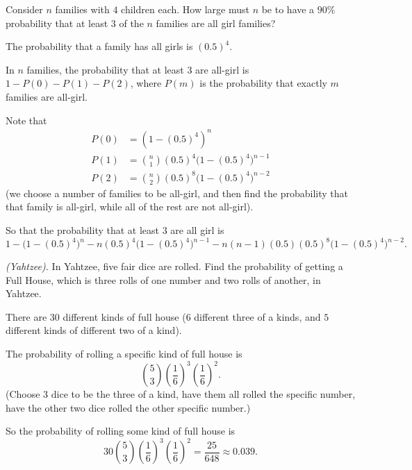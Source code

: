 \begin{problem}[Handout 5, \# 8]
  Consider \(n\) families with \(4\) children each. How large must \(n\) be
  to have a \(90\%\) probability that at least \(3\) of the \(n\) families
  are all girl families?
\end{problem}
\begin{solution}
  The probability that a family has all girls is $(0.5)^4$.

  In $n$ families, the probability that at least $3$ are all-girl is
  $1-P(0)-P(1)-P(2)$, where $P(m)$ is the probability that exactly $m$
  families are all-girl.

  Note that
  \begin{align*}
    P(0) &= (1-(0.5)^4)^n \\
    P(1) &= \binom{n}{1}(0.5)^4\bigl(1-(0.5)^4\bigr)^{n-1} \\
    P(2) &= \binom{n}{2}(0.5)^8\bigl(1-(0.5)^4\bigr)^{n-2}
  \end{align*}
  (we choose a number of families to be all-girl, and then find the
  probability that that family is all-girl, while all of the rest are not
  all-girl).

  So that the probability that at least $3$ are all girl is
  \[
    1-\bigl(1-(0.5)^4\bigr)^n - n(0.5)^4\bigl(1-(0.5)^4\bigr)^{n-1} -
    n(n-1)(0.5)(0.5)^8\bigl(1-(0.5)^4\bigr)^{n-2}.
  \]
\end{solution}
\newpage

\begin{problem}[Handout 5, \# 10]
  \emph{(Yahtzee).} In Yahtzee, five fair dice are rolled. Find the
  probability of getting a Full House, which is three rolls of one number
  and two rolls of another, in Yahtzee.
\end{problem}
\begin{solution}
  There are $30$ different kinds of full house ($6$ different three of a
  kinds, and $5$ different kinds of different two of a kind).

  The probability of rolling a specific kind of full house is
  \[
    \binom{5}{3} \left( \frac{1}{6}\right)^3 \left(\frac{1}{6} \right)^2.
  \]
  (Choose 3 dice to be the three of a kind, have them all rolled the
  specific number, have the other two dice rolled the other specific
  number.)

  So the probability of rolling some kind of full house is
  \[
    30 \binom{5}{3} \left( \frac{1}{6}\right)^3 \left(\frac{1}{6}
    \right)^2 = \frac{25}{648} \approx 0.039.
  \]
\end{solution}
\newpage

